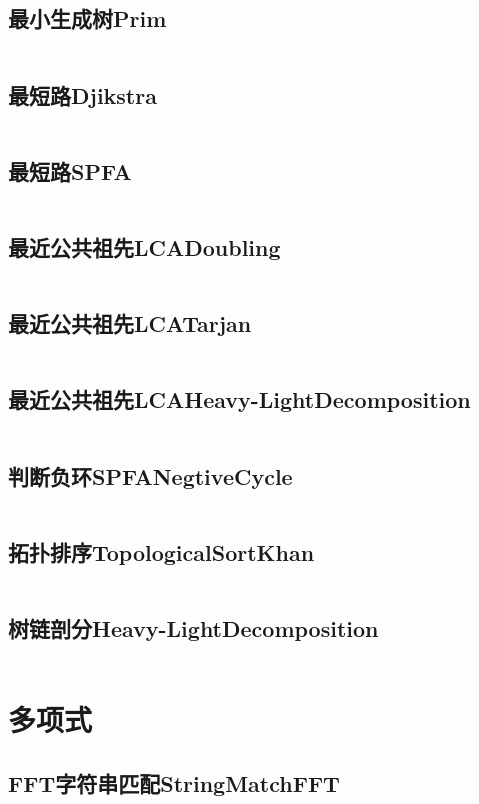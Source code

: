\documentclass[10pt,a4paper,twoside]{ctexbook}
\renewcommand{\_}{\textscale{1}{\textunderscore}} %
\begin{document}
\subsection{最小生成树Prim}
\inputminted{c++}{../Cpp/图论/最小生成树Prim.cpp}
\subsection{最短路Djikstra}
\inputminted{c++}{../Cpp/图论/最短路Djikstra.cpp}
\subsection{最短路SPFA}
\inputminted{c++}{../Cpp/图论/最短路SPFA.cpp}
\subsection{最近公共祖先LCA\_Doubling}
\inputminted{c++}{../Cpp/图论/最近公共祖先LCA_Doubling.cpp}
\subsection{最近公共祖先LCA\_Tarjan}
\inputminted{c++}{../Cpp/图论/最近公共祖先LCA_Tarjan.cpp}
\subsection{最近公共祖先LCA\_Heavy-Light\_Decomposition}
\inputminted{c++}{../Cpp/图论/最近公共祖先LCA_Heavy-Light_Decomposition.cpp}
\subsection{判断负环SPFA\_Negtive\_Cycle}
\inputminted{c++}{../Cpp/图论/判断负环SPFA_Negtive_Cycle.cpp}
\subsection{拓扑排序Topological\_Sort\_Khan}
\inputminted{c++}{../Cpp/图论/拓扑排序Topological_Sort_Khan.cpp}
\subsection{树链剖分Heavy-Light\_Decomposition}
\inputminted{c++}{../Cpp/图论/树链剖分Heavy-Light_Decomposition.cpp}

\newpage
\section{多项式}
\subsection{FFT字符串匹配String\_Match\_FFT}
\inputminted{c++}{../Cpp/多项式/FFT字符串匹配String_Match_FFT.cpp}
\end{document}
